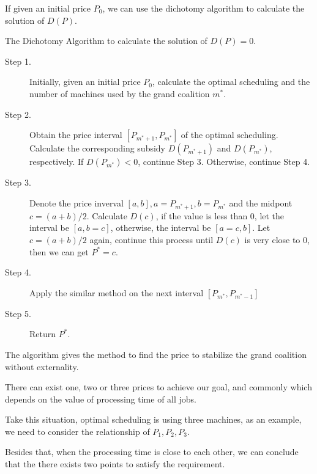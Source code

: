 If given an initial price $P_0$, we can use the dichotomy algorithm to calculate the solution of $D(P)$.

\begin{algorithm}[H]\label{algoDI}
\caption{The Dichotomy Algorithm to calculate the solution of $D(P)=0$.}
\begin{algorithmic}[1]
\begin{description}
  \item[Step 1.] Initially, given an initial price $P_0$, calculate the optimal scheduling and the number of machines used by the grand coalition $m^*$. \\
  \vspace{10pt}
  \item[Step 2.] Obtain the price interval $[P_{m^*+1},P_{m^*}]$ of the optimal scheduling. Calculate the corresponding subsidy $D(P_{m^*+1})$ and $D(P_{m^*})$, respectively. If $D(P_{m^*}) < 0$, continue Step 3. Otherwise, continue Step 4.
	\vspace{10pt}
  \item[Step 3.] Denote the price inverval $[a,b], a = P_{m^*+1}, b= P_{m^*}$ and the midpont $c =(a+b)/2$. Calculate $D(c)$, if the value is less than 0, let the interval be $[a, b=c]$, otherwise, the interval be $[a=c, b]$. Let $c =(a+b)/2$ again,
	continue this process until $D(c)$ is very close to 0, then we can get $P^{*} = c$.
  \item[Step 4.] Apply the similar method on the next interval $[P_{m^*},P_{m^*-1}]$
  \item[Step 5.] Return $P^{*}$.
\end{description}
\end{algorithmic}
\end{algorithm}

The algorithm gives the method to find the price to stabilize the grand coalition without externality.

There can exist one, two or three prices to achieve our goal, and commonly which depends on the value of processing time of all jobs.

Take this situation, optimal scheduling is using three machines, as an example, we need to consider the relationship of $P_1,P_2, P_3$.

Besides that, when the processing time is close to each other, we can conclude that the there exists two points to satisfy the requirement.
